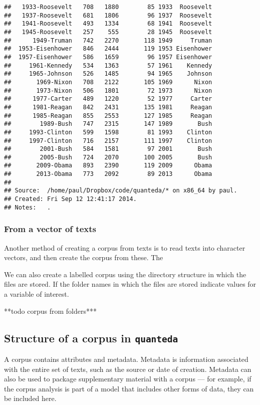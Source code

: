 \documentclass[11pt]{article}\usepackage[]{graphicx}\usepackage[]{color}
\makeatletter
\newenvironment{kframe}{%
 \def\at@end@of@kframe{}%
 \ifinner\ifhmode%
  \def\at@end@of@kframe{\end{minipage}}%
  \begin{minipage}{\columnwidth}%
 \fi\fi%
 \def\FrameCommand##1{\hskip\@totalleftmargin \hskip-\fboxsep
 \colorbox{shadecolor}{##1}\hskip-\fboxsep
     \hskip-\linewidth \hskip-\@totalleftmargin \hskip\columnwidth}%
 \MakeFramed {\advance\hsize-\width
   \@totalleftmargin\z@ \linewidth\hsize
   \@setminipage}}%
 {\par\unskip\endMakeFramed%
 \at@end@of@kframe}
\newenvironment{knitrout}{}{} %
\makeatother
\begin{document}
\begin{knitrout}
\begin{kframe}
\begin{verbatim}
##   1933-Roosevelt   708   1880        85 1933  Roosevelt
##   1937-Roosevelt   681   1806        96 1937  Roosevelt
##   1941-Roosevelt   493   1334        68 1941  Roosevelt
##   1945-Roosevelt   257    555        28 1945  Roosevelt
##      1949-Truman   742   2270       118 1949     Truman
##  1953-Eisenhower   846   2444       119 1953 Eisenhower
##  1957-Eisenhower   586   1659        96 1957 Eisenhower
##     1961-Kennedy   534   1363        57 1961    Kennedy
##     1965-Johnson   526   1485        94 1965    Johnson
##       1969-Nixon   708   2122       105 1969      Nixon
##       1973-Nixon   506   1801        72 1973      Nixon
##      1977-Carter   489   1220        52 1977     Carter
##      1981-Reagan   842   2431       135 1981     Reagan
##      1985-Reagan   855   2553       127 1985     Reagan
##        1989-Bush   747   2315       147 1989       Bush
##     1993-Clinton   599   1598        81 1993    Clinton
##     1997-Clinton   716   2157       111 1997    Clinton
##        2001-Bush   584   1581        97 2001       Bush
##        2005-Bush   724   2070       100 2005       Bush
##       2009-Obama   893   2390       119 2009      Obama
##       2013-Obama   773   2092        89 2013      Obama
## 
## Source:  /home/paul/Dropbox/code/quanteda/* on x86_64 by paul.
## Created: Fri Sep 12 12:41:17 2014.
## Notes:   .
\end{verbatim}
\end{kframe}
\end{knitrout}

\subsubsection{From a vector of texts}

Another method of creating a corpus from texts is to read texts into character vectors, and then create the corpus from these. The 


We can also create a labelled corpus using the directory structure in which the files are stored. If the folder names in which the files are stored indicate values for a variable of interest.

**todo corpus from folders***

\subsection{Structure of a corpus in \texttt{quanteda}}
A corpus contains attributes and metadata. Metadata is information associated with the entire set of texts, such as the source or date of creation. Metadata can also be used to package supplementary material with a corpus --- for example, if the corpus analysis is part of a model that includes other forms of data, they can be included here.
\end{document}
